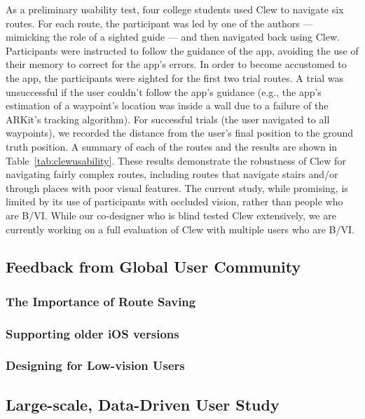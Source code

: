 \documentclass[chi_draft]{sigchi}
\newcommand{\BVI}{B/VI\xspace}
\begin{document}
As a preliminary usability test, four college students used Clew to navigate six routes.  For each route, the participant was led by one of the authors --- mimicking the role of a sighted guide --- and then navigated back using Clew.  Participants were instructed to follow the guidance of the app, avoiding the use of their memory to correct for the app's errors.  In order to become accustomed to the app, the participants were sighted for the first two trial routes.  A trial was unsuccessful if the user couldn't follow the app's guidance (e.g., the app's estimation of a waypoint's location was inside a wall due to a failure of the ARKit's tracking algorithm). For successful trials (the user navigated to all waypoints), we recorded the distance from the user's final position to the ground truth position.  A summary of each of the routes and the results are shown in Table~\ref{tab:clewusability}.  These results demonstrate the robustness of Clew for navigating fairly complex routes, including routes that navigate stairs and/or through places with poor visual features.  The current study, while promising, is limited by its use of participants with occluded vision, rather than people who are \BVI.  While our co-designer who is blind tested Clew extensively, we are currently working on a full evaluation of Clew with multiple users who are \BVI.

\subsection{Feedback from Global User Community}


\subsubsection{The Importance of Route Saving}


\subsubsection{Supporting older iOS versions}

\subsubsection{Designing for Low-vision Users}

\subsection{Large-scale, Data-Driven User Study}\label{sec:largescalestudy}
\end{document}
